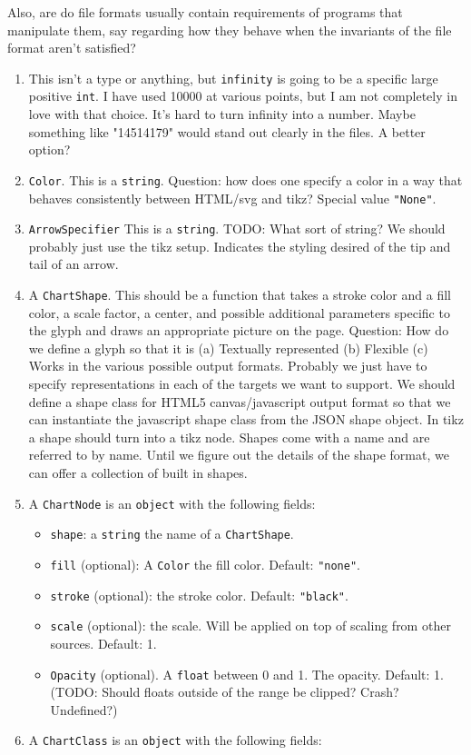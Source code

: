 \documentclass{article}
\begin{document}
Also, are do file formats usually contain requirements of programs that manipulate them, say regarding how they behave when the invariants of the file format aren't satisfied?
\begin{enumerate}
\item This isn't a type or anything, but \texttt{infinity} is going to be a specific large positive \texttt{int}.
    I have used 10000 at various points, but I am not completely in love with that choice.
    It's hard to turn infinity into a number. Maybe something like "14514179" would stand out clearly in the files.
    A better option?
\item
    \texttt{Color}.
    This is a \texttt{string}.
    Question: how does one specify a color in a way that behaves consistently between HTML/svg and tikz?
    Special value \texttt{"None"}.

\item
    \texttt{ArrowSpecifier}
    This is a \texttt{string}. TODO: What sort of string?
    We should probably just use the tikz setup.
    Indicates the styling desired of the tip and tail of an arrow.

\item
    A \texttt{ChartShape}.
    This should be a function that takes a stroke color and a fill color, a scale factor, a center, and possible additional parameters specific to the glyph and draws an appropriate picture on the page.
    Question: How do we define a glyph so that it is
    (a) Textually represented
    (b) Flexible
    (c) Works in the various possible output formats.
    Probably we just have to specify representations in each of the targets we want to support.
    We should define a shape class for HTML5 canvas/javascript output format so that we can instantiate the javascript shape class from the JSON shape object.
    In tikz a shape should turn into a tikz node.
    Shapes come with a name and are referred to by name.
    Until we figure out the details of the shape format, we can offer a collection of built in shapes.

\item A \texttt{ChartNode} is an \texttt{object} with the following fields:
    \begin{itemize}
    \item    \texttt{shape}: a \texttt{string} the name of a \texttt{ChartShape}.
    \item    \texttt{fill} (optional): A \texttt{Color} the fill color. Default: \texttt{"none"}.
    \item    \texttt{stroke} (optional): the stroke color. Default: \texttt{"black"}.
    \item    \texttt{scale} (optional): the scale. Will be applied on top of scaling from other sources. Default: 1.
    \item  \texttt{Opacity} (optional). A \texttt{float} between 0 and 1. The opacity. Default: 1. (TODO: Should floats outside of the range be clipped? Crash? Undefined?)
    \end{itemize}
\item A \texttt{ChartClass} is an \texttt{object} with the following fields:


\end{enumerate}
\end{document}
